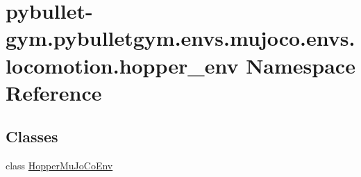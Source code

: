 \hypertarget{namespacepybullet-gym_1_1pybulletgym_1_1envs_1_1mujoco_1_1envs_1_1locomotion_1_1hopper__env}{}\section{pybullet-\/gym.pybulletgym.\+envs.\+mujoco.\+envs.\+locomotion.\+hopper\+\_\+env Namespace Reference}
\label{namespacepybullet-gym_1_1pybulletgym_1_1envs_1_1mujoco_1_1envs_1_1locomotion_1_1hopper__env}
\subsection*{Classes}
\begin{DoxyCompactItemize}
\item 
class \hyperlink{classpybullet-gym_1_1pybulletgym_1_1envs_1_1mujoco_1_1envs_1_1locomotion_1_1hopper__env_1_1_hopper_mu_jo_co_env}{Hopper\+Mu\+Jo\+Co\+Env}
\end{DoxyCompactItemize}
